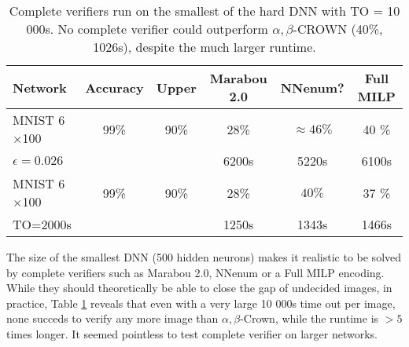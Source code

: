 \begin{table}[b!]
	\centering
	\begin{tabular}{||l|c|c||c|c|c||}
		\hline
		Network &  Accuracy & Upper  & Marabou 2.0 & NNenum? &  Full MILP  \\ \hline
		MNIST 6$\times$100 & 99\% & 90\% & 28\% & $\approx 46\%$ & 40 \%    \\
		$\epsilon = 0.026$ & &  &6200s &  5220s & 6100s
		  \\  \hline
		  MNIST 6$\times$100 & 99\% & 90\% & 28\% & $40\%$ & 37 \%    \\
		  TO=2000s & &  & 1250s  & 1343s & 1466s \\  \hline	
	\end{tabular}
\caption{Complete verifiers run on the smallest of the hard DNN with TO = 10 000s. 
No complete verifier could outperform $\alpha,\beta$-CROWN (40\%, 1026s), despite the much larger runtime.}
\label{table_complete}
\end{table}



The size of the smallest DNN (500 hidden neurons) makes it realistic to be solved by complete verifiers such as Marabou 2.0, NNenum or a Full MILP encoding. 
While they should theoretically be able to close the gap of undecided images,
in practice, Table \ref{table_complete} reveals that even with a very large 10 000s time out per image, none succeds to verify any more image than $\alpha,\beta$-Crown, while the runtime is $>5$ times longer. It seemed pointless to test complete verifier on larger networks.









